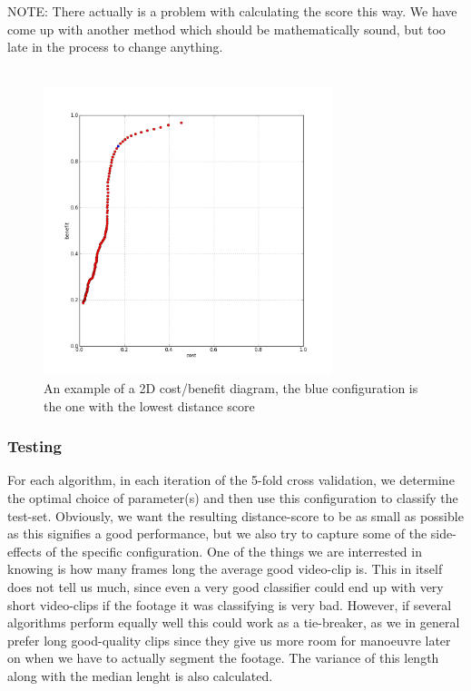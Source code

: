 %
NOTE: There actually is a problem with calculating the score this way. We have come up with another method which should be mathematically sound, but too late in the process to change anything.\\\\
%
\begin{figure}
     \centering
     \includegraphics[width=0.75\textwidth]{img/2dcostbenefitexample2.jpg}
     \caption{An example of a 2D cost/benefit diagram, the blue configuration is the one with the lowest distance score}
\end{figure}
%
\subsubsection{Testing}
For each algorithm, in each iteration of the 5-fold cross validation, we determine the optimal choice of parameter(s) and then use this configuration to classify the test-set. Obviously, we want the resulting distance-score to be as small as possible as this signifies a good performance, but we also try to capture some of the side-effects of the specific configuration. One of the things we are interrested in knowing is how many frames long the average good video-clip is. This in itself does not tell us much, since even a very good classifier could end up with very short video-clips if the footage it was classifying is very bad. However, if several algorithms perform equally well this could work as a tie-breaker, as we in general prefer long good-quality clips since they give us more room for manoeuvre later on when we have to actually segment the footage. The variance of this length along with the median lenght is also calculated.
%
